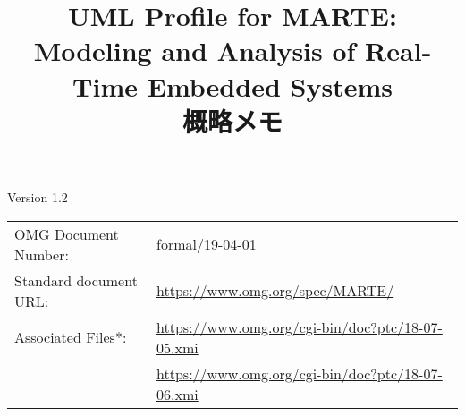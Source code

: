 \documentclass[a4paper,11pt]{ltjsarticle}
\title{UML Profile for MARTE\texttrademark : 
Modeling and Analysis of Real-Time Embedded Systems\\
概略メモ}
\begin{document}
\maketitle

\begin{flushleft}
Version 1.2
\end{flushleft}

\begin{center}
\begin{tabular}{ll}
\hline
OMG Document Number:	&	formal/19-04-01	\\
Standard document URL:	&	\url{https://www.omg.org/spec/MARTE/}	\\
Associated Files*:		&	\url{https://www.omg.org/cgi-bin/doc?ptc/18-07-05.xmi}	\\
						&	\url{https://www.omg.org/cgi-bin/doc?ptc/18-07-06.xmi}	\\
\hline
\end{tabular}
\end{center}



\end{document}
